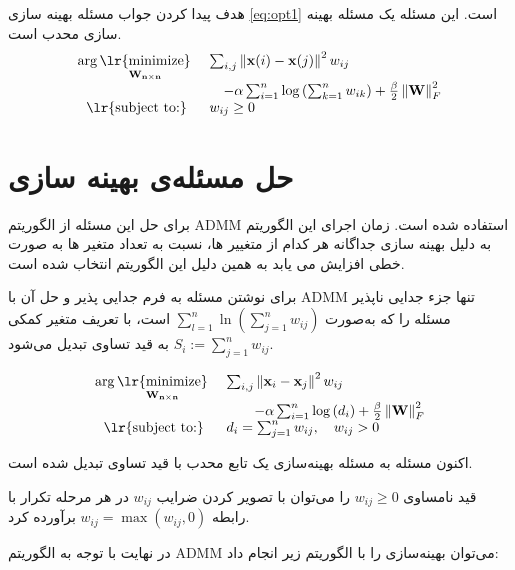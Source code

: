 \documentclass[10pt,twocolumn,a4paper]{article}
\newcommand\minimize[1]{\mathop{\text{\lr{minimize}}}\limits_{#1}\ }
\begin{document}
	هدف پیدا کردن جواب مسئله بهینه سازی
	\ref{eq:opt1}
	است. این مسئله یک مسئله بهینه سازی محدب است. 
	\begin{equation}\label{eq:opt1}
		\begin{array}{cl}
			\arg \minimize{\mathbf{W_{n \times n}}} &\sum_{i,j} \left\| \mathbf{x}(i) - \mathbf{x}(j) \right\|^2 w_{ij} \\ &\quad - \alpha \sum_{i=1}^{n} \log \left( \sum_{k=1}^{n} w_{ik} \right) + \frac{\beta}{2} \left\| \mathbf{W} \right\|_F^2 \\
			\text{\lr{subject to:}} & w_{ij} \geq 0
		\end{array}
	\end{equation}
	\section{حل مسئله‌ی بهینه سازی} \label{sec:optsol}
	
	برای حل این مسئله از الگوریتم ADMM استفاده شده است. زمان اجرای این الگوریتم به دلیل بهینه سازی جداگانه هر کدام از متغییر ها، نسبت به تعداد متغیر ها به صورت خطی افزایش می یابد به همین دلیل این الگوریتم انتخاب شده است.
	
	برای نوشتن مسئله به فرم جدایی پذیر و حل آن با ADMM تنها جزء جدایی ناپذیر
	مسئله را که به‌صورت
	$
	\sum_{l=1}^{n} \ln \left( \sum_{j=1}^{n} w_{ij} \right)
	$
	است، با تعریف متغیر کمکی 	$S_i := \sum_{j=1}^{n} w_{ij}$	به قید تساوی تبدیل می‌شود.
	
	
	
	\begin{equation}\label{eq:opt2}
		\begin{array}{cl}
			\arg \minimize{\mathbf{W_{n \times n}}}&\sum_{i,j} \left\| \mathbf{x}_i - \mathbf{x}_j \right\|^2 w_{ij}
			\\&\qquad- \alpha \sum_{i=1}^{n} \log \left( d_i \right) + \frac{\beta}{2} \left\| \mathbf{W} \right\|_F^2 \\
			\text{\lr{subject to:}} &d_i = \sum_{j=1}^{n} w_{ij}, \quad w_{ij} > 0
		\end{array}
	\end{equation}
	
	اکنون مسئله به مسئله بهینه‌سازی یک تابع محدب با قید تساوی تبدیل شده است.
	
	قید نامساوی $w_{ij} \geq 0$ را می‌توان با تصویر کردن ضرایب \( w_{ij} \)
	در هر مرحله تکرار با رابطه $w_{ij} = \max(w_{ij}, 0)$ برآورده کرد.
	
	در نهایت با توجه به الگوریتم ADMM می‌توان بهینه‌سازی را با الگوریتم زیر انجام داد:
	
\end{document}
